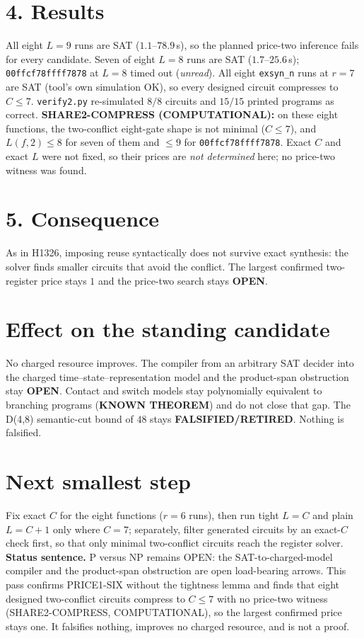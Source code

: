 \documentclass[11pt]{article}
\begin{document}
\section*{4. Results}
All eight $L=9$ runs are SAT ($1.1$--$78.9$\,s), so the planned price-two inference fails for every candidate. Seven of eight $L=8$ runs are SAT ($1.7$--$25.6$\,s); \texttt{00ffcf78ffff7878} at $L=8$ timed out (\emph{unread}). All eight \texttt{exsyn\_n} runs at $r=7$ are SAT (tool's own simulation OK), so every designed circuit compresses to $C\le7$. \texttt{verify2.py} re-simulated $8/8$ circuits and $15/15$ printed programs as correct.
\textbf{SHARE2-COMPRESS (COMPUTATIONAL):} on these eight functions, the two-conflict eight-gate shape is not minimal ($C\le7$), and $L(f,2)\le8$ for seven of them and $\le9$ for \texttt{00ffcf78ffff7878}. Exact $C$ and exact $L$ were not fixed, so their prices are \emph{not determined} here; no price-two witness was found.
\section*{5. Consequence}
As in H1326, imposing reuse syntactically does not survive exact synthesis: the solver finds smaller circuits that avoid the conflict. The largest confirmed two-register price stays $1$ and the price-two search stays \textbf{OPEN}.
\section*{Effect on the standing candidate}
No charged resource improves. The compiler from an arbitrary SAT decider into the charged time--state--representation model and the product-span obstruction stay \textbf{OPEN}. Contact and switch models stay polynomially equivalent to branching programs (\textbf{KNOWN THEOREM}) and do not close that gap. The D(4,8) semantic-cut bound of $48$ stays \textbf{FALSIFIED/RETIRED}. Nothing is falsified.
\section*{Next smallest step}
Fix exact $C$ for the eight functions ($r=6$ runs), then run tight $L=C$ and plain $L=C+1$ only where $C=7$; separately, filter generated circuits by an exact-$C$ check first, so that only minimal two-conflict circuits reach the register solver.
\bigskip
\noindent\textbf{Status sentence.} P versus NP remains OPEN: the SAT-to-charged-model compiler and the product-span obstruction are open load-bearing arrows. This pass confirms PRICE1-SIX without the tightness lemma and finds that eight designed two-conflict circuits compress to $C\le7$ with no price-two witness (SHARE2-COMPRESS, COMPUTATIONAL), so the largest confirmed price stays one. It falsifies nothing, improves no charged resource, and is not a proof.
\end{document}
